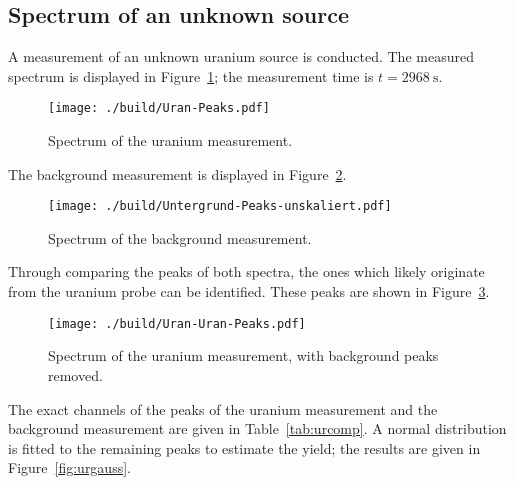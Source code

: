 \subsection{Spectrum of an unknown source}
A measurement of an unknown uranium source is conducted. The measured spectrum is displayed in
Figure~\ref{fig:urspectrum}; the measurement time is $t=\SI{2968}{\second}$.
\begin{figure}[H]
	\centering
	\begin{adjustbox}{width=1.4\textwidth, center}
		\texttt{[image: ./build/Uran-Peaks.pdf]}
	\end{adjustbox}
	\caption{Spectrum of the uranium measurement.}
	\label{fig:urspectrum}
\end{figure}
\noindent
The background measurement is displayed in Figure~\ref{fig:urbackground}.
\begin{figure}[H]
	\centering
	\begin{adjustbox}{width=1.4\textwidth, center}
		\texttt{[image: ./build/Untergrund-Peaks-unskaliert.pdf]}
	\end{adjustbox}
	\caption{Spectrum of the background measurement.}
	\label{fig:urbackground}
\end{figure}
\noindent
Through comparing the peaks of both spectra, the ones which likely originate from the uranium probe
can be identified. These peaks are shown in Figure~\ref{fig:urcomp}.
\begin{figure}[H]
	\centering
	\begin{adjustbox}{width=1.4\textwidth, center}
		\texttt{[image: ./build/Uran-Uran-Peaks.pdf]}
	\end{adjustbox}
	\caption{Spectrum of the uranium measurement, with background peaks removed.}
	\label{fig:urcomp}
\end{figure}
\noindent
The exact channels of the peaks of the uranium measurement and the background measurement are given in
Table~\ref{tab:urcomp}. A normal distribution is fitted to the remaining peaks to estimate the yield;
the results are given in Figure~\ref{fig:urgauss}.
